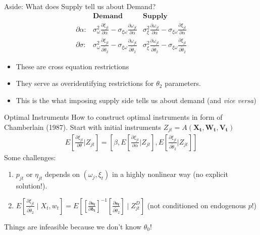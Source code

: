 \documentclass[xcolor=pdftex,dvipsnames,table,mathserif,aspectratio=169]{beamer}
\newcommand{\del}{\partial}
\begin{document}
\begin{frame}{Aside: What does Supply tell us about Demand?}
\begin{align*}
& \textbf{Demand} & \textbf{Supply} \\
\del \alpha:& 
        \sigma_\omega^2 \frac{\partial \xi_{jt}}{\partial \alpha} - 
        \sigma_{\xi\omega}\frac{\partial \omega_{jt}}{\partial \alpha} 
        & \sigma_{\xi}^2 \frac{\partial \omega_{jt}}{\partial \alpha}  - 
        \sigma_{\xi\omega}\frac{\partial \xi_{jt}}{\partial \alpha}  \\
\del \sigma:& 
        \sigma_\omega^2 \frac{\partial \xi_{jt}}{\partial \widetilde{\theta}_2}  -
        \sigma_{\xi\omega}\frac{\partial \omega_{jt}}{\partial \widetilde{\theta}_2} 
        & \sigma_{\xi}^2 \frac{\partial \omega_{jt}}{\partial \widetilde{\theta}_2} - 
        \sigma_{\xi\omega}\frac{\partial \xi_{jt}}{\partial \widetilde{\theta}_2}
\end{align*}
\begin{itemize}
\item These are \alert{cross equation restrictions}
\item They serve as \alert{overidentifying restrictions} for $\theta_2$ parameters.
\item This is the what imposing supply side tells us about demand (and \textit{vice versa})
\end{itemize}
\end{frame}


\begin{frame}{Optimal Instruments}
How to construct optimal instruments in form of Chamberlain (1987). Start with initial instruments $Z_{jt}=A\left(\mathbf{X_t},\mathbf{W_t},\mathbf{V_t}\right)$
\begin{eqnarray*}
E\left[\frac{\partial \xi_{jt}}{\partial \theta} | Z_{jt} \right] = \left[\beta, E\left[\frac{\partial \xi_{jt}}{\partial \alpha} | Z_{jt} \right] ,
 E\left[\frac{\partial \xi_{jt}}{\partial \widetilde{\theta}_2} | Z_{jt} \right] \right]
\end{eqnarray*}
Some challenges:
\begin{enumerate}
\item $p_{jt}$ or $\eta_{jt}$ depends on $(\omega_{j},\xi_{t})$ in a highly nonlinear way (no explicit solution!).
\item $E\left[\frac{\partial \xi_{jt}}{\partial \widetilde{\theta}_2} \mid X_t, w_{t} \right] =E\left[\left[\frac{\partial \mathbf{s_t}}{\partial \mathbf{\delta_t}}\right]^{-1} 
\left[\frac{\partial \mathbf{s_t}}{\partial \widetilde{\theta}_2}\right] \mid Z_{jt}^D \right]$  (not conditioned on endogenous $p$!)
\end{enumerate}
Things are \alert{infeasible} because we don't know $\theta_0$!
\end{frame}
\end{document}
